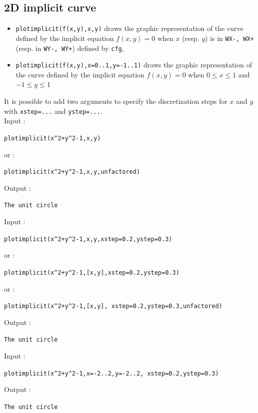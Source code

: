 \documentclass[a4paper,11pt]{book}
\begin{document}
\subsection{2D implicit curve}\label{sec:implicitplot}
\begin{itemize}
\item {\tt plotimplicit(f(x,y),x,y)} draws the graphic representation of the
curve defined by the implicit equation $f(x,y)=0$ when $x$ (resp. $y$) 
is in {\tt WX-, WX+} (resp. in {\tt WY-, WY+}) defined by {\tt cfg}, 

\item {\tt plotimplicit(f(x,y),x=0..1,y=-1..1)} draws the graphic 
representation of the curve defined by the implicit equation $f(x,y)=0$ 
when $0\leq x \leq 1$ and $-1\leq y \leq 1$
\end{itemize} 
It is possible to add two arguments to specify the discretization
steps for $x$ 
and $y$ with {\tt xstep=...} and {\tt ystep=...}.\\
Input :
\begin{center}{\tt plotimplicit(x\verb|^|2+y\verb|^|2-1,x,y)}\end{center}
or :
\begin{center}{\tt plotimplicit(x\verb|^|2+y\verb|^|2-1,x,y,unfactored)}\end{center}
Output :
\begin{center}{\tt The unit circle}\end{center}
Input :
\begin{center}{\tt plotimplicit(x\verb|^|2+y\verb|^|2-1,x,y,xstep=0.2,ystep=0.3)}\end{center}
or :
\begin{center}{\tt plotimplicit(x\verb|^|2+y\verb|^|2-1,[x,y],xstep=0.2,ystep=0.3)}\end{center}
or :
\begin{center}{\tt plotimplicit(x\verb|^|2+y\verb|^|2-1,[x,y], xstep=0.2,ystep=0.3,unfactored)}\end{center}
Output :
\begin{center}{\tt The unit circle}\end{center}
Input :
\begin{center}{\tt plotimplicit(x\verb|^|2+y\verb|^|2-1,x=-2..2,y=-2..2, xstep=0.2,ystep=0.3)}\end{center}
Output :
\begin{center}{\tt The unit circle}\end{center}
\end{document}
